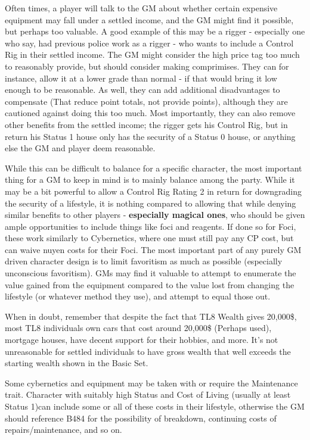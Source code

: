 \begin{multicols*}{2}
	Often times, a player will talk to the GM about whether certain expensive equipment may fall under a settled income, and the GM might find it possible, but perhaps too valuable. A good example of this may be a rigger - especially one who say, had previous police work as a rigger - who wants to include a Control Rig in their settled income. The GM might consider the high price tag too much to reasonably provide, but should consider making comprimises. They can for instance, allow it at a lower grade than normal - if that would bring it low enough to be reasonable. As well, they can add additional disadvantages to compensate (That reduce point totals, not provide points), although they are cautioned against doing this too much. Most importantly, they can also remove other benefits from the settled income; the rigger gets his Control Rig, but in return his Status 1 house only has the security of a Status 0 house, or anything else the GM and player deem reasonable.
	
	While this can be difficult to balance for a specific character, the most important thing for a GM to keep in mind is to mainly balance among the party. While it may be a bit powerful to allow a Control Rig Rating 2 in return for downgrading the security of a lifestyle, it is nothing compared to allowing that while denying similar benefits to other players - \textbf{especially magical ones}, who should be given ample opportunities to include things like foci and reagents. If done so for Foci, these work similarly to Cybernetics, where one must still pay any CP cost, but can waive nuyen costs for their Foci. The most important part of any purely GM driven character design is to limit favoritism as much as possible (especially unconscious favoritism). GMs may find it valuable to attempt to enumerate the value gained from the equipment compared to the value lost from changing the lifestyle (or whatever method they use), and attempt to equal those out.
	
	When in doubt, remember that despite the fact that TL8 Wealth gives 20,000\$, most TL8 individuals own cars that cost around 20,000\$ (Perhaps used), mortgage houses, have decent support for their hobbies, and more. It's not unreasonable for settled individuals to have gross wealth that well exceeds the starting wealth shown in the Basic Set.
	
	Some cybernetics and equipment may be taken with or require the Maintenance trait. Character with suitably high Status and Cost of Living (usually at least Status 1)can include some or all of these costs in their lifestyle, otherwise the GM should reference B484 for the possibility of breakdown, continuing costs of repairs/maintenance, and so on.
	

\end{multicols*}
